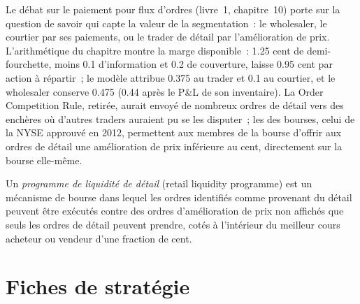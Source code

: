 Le débat sur le paiement pour flux d'ordres (livre~1, chapitre~10) porte sur la question de savoir qui capte la valeur de la segmentation~: le wholesaler, le courtier par ses paiements,
ou le trader de détail par l'amélioration de prix. L'arithmétique du chapitre montre la marge disponible~: 1.25 cent de demi-fourchette, moins 0.1 d'information et 0.2
de couverture, laisse 0.95 cent par action à répartir~; le modèle attribue 0.375 au trader et 0.1 au courtier, et le wholesaler conserve 0.475 (0.44
après le P\&L de son inventaire). La Order Competition Rule, retirée, aurait envoyé de nombreux ordres de détail vers des enchères
où d'autres traders auraient pu se les disputer~; les  des bourses, celui de la NYSE approuvé en 2012, permettent aux membres de la bourse d'offrir
aux ordres de détail une amélioration de prix inférieure au cent, directement sur la bourse elle-même.

\begin{definition}\label{def:hf:retail-wholesaling:rlp}
Un \emph{programme de liquidité de détail} (retail liquidity programme) est un mécanisme de bourse dans lequel les ordres identifiés comme provenant du détail peuvent être exécutés
contre des ordres d'amélioration de prix non affichés que seuls les ordres de détail peuvent prendre, cotés à l'intérieur du meilleur cours acheteur ou vendeur d'une fraction de cent.
\end{definition}

\section{Fiches de stratégie}

